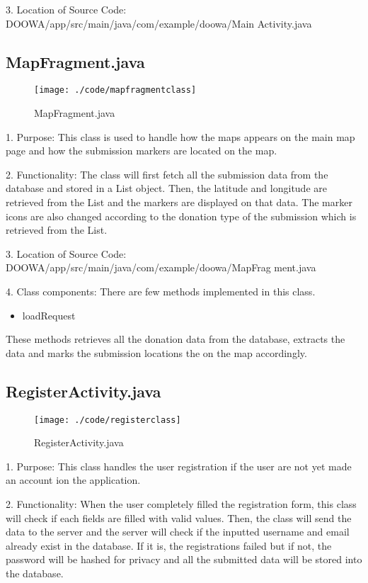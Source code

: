 \documentclass[conference]{IEEEtran}
\begin{document}
3. Location of Source Code: DOOWA/app/src/main/java/com/example/doowa/Main Activity.java\break
\break
\subsection{MapFragment.java}
\begin{figure}[h!]
\texttt{[image: ./code/mapfragmentclass]}
\centering
\caption{MapFragment.java}
\end{figure}
1. Purpose: This class is used to handle how the maps appears on the main map page and how the submission markers are located on the map.\break
\par 2. Functionality: The class will first fetch all the submission data from the database and stored in a List object. Then, the latitude and longitude are retrieved from the List and the markers are displayed on that data. The marker icons are also changed according to the donation type of the submission which is retrieved from the List.\break

3. Location of Source Code: DOOWA/app/src/main/java/com/example/doowa/MapFrag ment.java\break

4. Class components: There are few methods implemented in this class.
\begin{itemize}
\item loadRequest
\end{itemize}
These methods retrieves all the donation data from the database, extracts the data and marks the submission locations the on the map accordingly.
\break
\subsection{RegisterActivity.java}
\begin{figure}[h!]
\texttt{[image: ./code/registerclass]}
\centering
\caption{RegisterActivity.java}
\end{figure}
1. Purpose: This class handles the user registration if the user are not yet made an account ion the application.\break
\par 2. Functionality: When the user completely filled the registration form, this class will check if each fields are filled with valid values. Then, the class will send the data to the server and the server will check if the inputted username and email already exist in the database. If it is, the registrations failed but if not, the password will be hashed for privacy and all the submitted data will be stored into the database. \break
\end{document}
